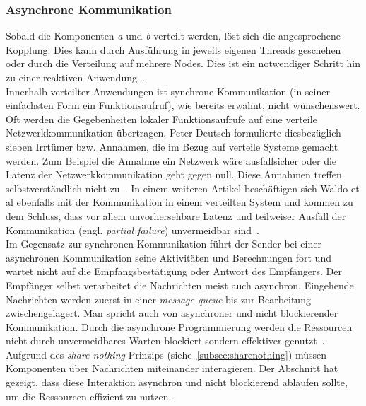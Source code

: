 \subsubsection{Asynchrone Kommunikation}
Sobald die Komponenten \textit{a} und \textit{b} verteilt werden, löst sich die angesprochene Kopplung. Dies kann durch Ausführung in jeweils eigenen Threads geschehen oder durch die Verteilung auf mehrere Nodes. Dies ist ein notwendiger Schritt hin zu einer reaktiven Anwendung~\cite[S.~22]{kuhn_reactive_2015}.\\
Innerhalb verteilter Anwendungen ist synchrone Kommunikation (in seiner einfachsten Form ein Funktionsaufruf), wie bereits erwähnt, nicht wünschenswert. Oft werden die Gegebenheiten lokaler Funktionsaufrufe auf eine verteile Netzwerkkommunikation übertragen. Peter Deutsch formulierte diesbezüglich sieben Irrtümer bzw. Annahmen, die im Bezug auf verteile Systeme gemacht werden. Zum Beispiel die Annahme ein Netzwerk wäre ausfallsicher oder die Latenz der Netzwerkkommunikation geht gegen null. Diese Annahmen treffen selbstverständlich nicht zu~\cite[S.~1]{rotem_fallacies_2008}. In einem weiteren Artikel beschäftigen sich Waldo et al ebenfalls mit der Kommunikation in einem verteilten System und kommen zu dem Schluss, dass vor allem unvorhersehbare Latenz und teilweiser Ausfall der Kommunikation (engl. \textit{partial failure}) unvermeidbar sind~\cite{waldo_note_1994}.\\
Im Gegensatz zur synchronen Kommunikation führt der Sender bei einer asynchronen Kommunikation seine Aktivitäten und Berechnungen fort und wartet nicht auf die Empfangsbestätigung oder Antwort des Empfängers. Der Empfänger selbst verarbeitet die Nachrichten meist auch asynchron. Eingehende Nachrichten werden zuerst in einer \textit{message queue} bis zur Bearbeitung zwischengelagert. Man spricht auch von asynchroner und nicht blockierender Kommunikation. Durch die asynchrone Programmierung werden die Ressourcen nicht durch unvermeidbares Warten blockiert sondern effektiver genutzt~\cite[S.~48]{kuhn_reactive_2015}.\\

Aufgrund des \textit{share nothing} Prinzips (siehe~\ref{subsec:sharenothing}) müssen Komponenten über Nachrichten miteinander interagieren. Der Abschnitt hat gezeigt, dass diese Interaktion asynchron und nicht blockierend ablaufen sollte, um die Ressourcen effizient zu nutzen~\cite[S.~48~\&~S.~49]{kuhn_reactive_2015}.

\pagebreak

